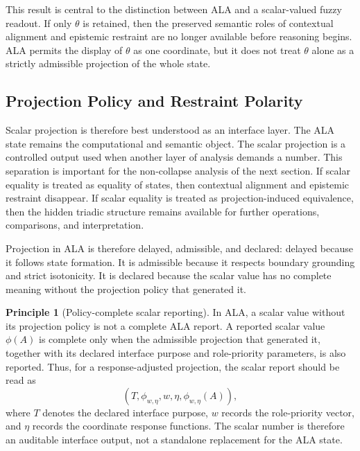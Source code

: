 \documentclass[reqno,final]{amsart}
\theoremstyle{definition}
\newtheorem{principle}{Principle}
\theoremstyle{plain}
\theoremstyle{remark}
\begin{document}
This result is central to the distinction between ALA and a scalar-valued fuzzy readout. If only \(\theta\) is retained, then the preserved semantic roles of contextual alignment and epistemic restraint are no longer available before reasoning begins. ALA permits the display of \(\theta\) as one coordinate, but it does not treat \(\theta\) alone as a strictly admissible projection of the whole state.

\subsection{Projection Policy and Restraint Polarity}
Scalar projection is therefore best understood as an interface layer. The ALA state remains the computational and semantic object. The scalar projection is a controlled output used when another layer of analysis demands a number. This separation is important for the non-collapse analysis of the next section. If scalar equality is treated as equality of states, then contextual alignment and epistemic restraint disappear. If scalar equality is treated as projection-induced equivalence, then the hidden triadic structure remains available for further operations, comparisons, and interpretation.

Projection in ALA is therefore delayed, admissible, and declared: delayed because it follows state formation. It is admissible because it respects boundary grounding and strict isotonicity. It is declared because the scalar value has no complete meaning without the projection policy that generated it.

\begin{principle}[Policy-complete scalar reporting]
\label{prin:policy-complete-reporting}
In ALA, a scalar value without its projection policy is not a complete
ALA report. A reported scalar value \(\phi(A)\) is complete only when the
admissible projection that generated it, together with its declared
interface purpose and role-priority parameters, is also reported. Thus, for
a response-adjusted projection, the scalar report should be read as
\[
(T,\phi_{w,\eta},w,\eta,\phi_{w,\eta}(A)),
\]
where \(T\) denotes the declared interface purpose, \(w\) records the
role-priority vector, and \(\eta\) records the coordinate response
functions. The scalar number is therefore an auditable interface output,
not a standalone replacement for the ALA state.
\end{principle}
\end{document}
